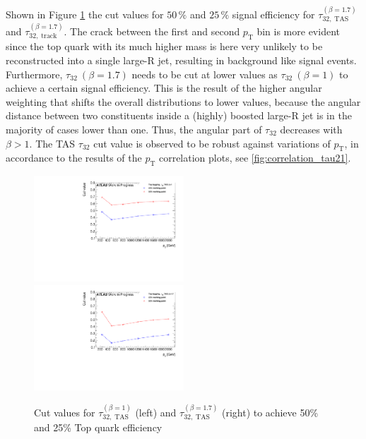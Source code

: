 Shown in Figure \ref{fig:top_cut} the cut values for $50\,\%$ and $25\,\%$ signal efficiency for $\tau_{32,\;\text{TAS}}^{(\beta=1.7)}$ and $\tau_{32,\;\text{track}}^{(\beta=1.7)}$. The crack between the first and second $p_{\mathrm{T}}$ bin is more evident since the top quark with its much higher mass is here very unlikely to be reconstructed into a single large-R jet, resulting in background like signal events. Furthermore, $\tau_{32} \: (\beta=1.7)$ needs to be cut at lower values as $\tau_{32}\: (\beta=1)$ to achieve a certain signal efficiency. This is the result of the higher angular weighting that shifts the overall distributions to lower values, because the angular distance between two constituents inside a (highly) boosted large-R jet is in the majority of cases lower than one. Thus, the angular part of $\tau_{32}$ decreases with $\beta > 1$. The TAS $\tau_{32}$ cut value is observed to be robust against variations of $p_{\mathrm{T}}$, in accordance to the results of the $p_{\mathrm{T}}$ correlation plots, see \ref{fig:correlation_tau21}.
\begin{figure}[htp]
\includegraphics[width=0.5\textwidth]{sascha_input/plots/Top/cut_values/tau32_tas1.pdf} \hspace{1mm}
\includegraphics[width=0.5\textwidth]{sascha_input/plots/Top/cut_values/tau32_tas17.pdf}
\caption{\footnotesize{Cut values for $\tau_{32,\;\text{TAS}}^{(\beta=1)}$ (left) and $\tau_{32,\;\text{TAS}}^{(\beta=1.7)}$ (right) to achieve 50\% and 25\% Top quark efficiency}}\label{fig:top_cut}
\end{figure}

